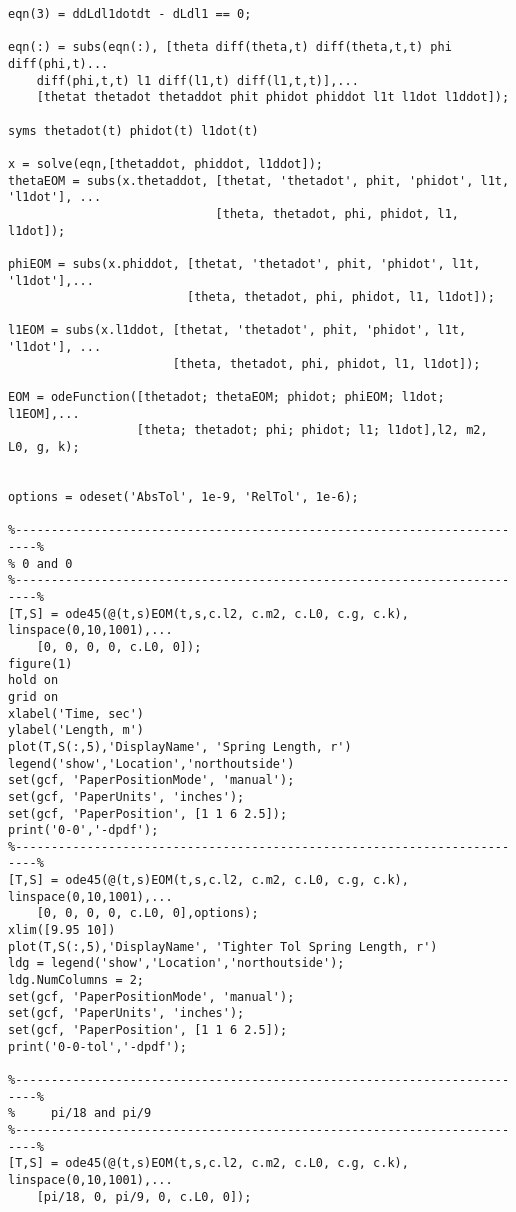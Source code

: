 \begin{lstlisting}[frame=lines,style=Matlab-editor,basicstyle = \mlttfamily]
% l (spring) EOM
eqn(3) = ddLdl1dotdt - dLdl1 == 0;

eqn(:) = subs(eqn(:), [theta diff(theta,t) diff(theta,t,t) phi diff(phi,t)...
    diff(phi,t,t) l1 diff(l1,t) diff(l1,t,t)],...
    [thetat thetadot thetaddot phit phidot phiddot l1t l1dot l1ddot]);

syms thetadot(t) phidot(t) l1dot(t)

x = solve(eqn,[thetaddot, phiddot, l1ddot]);
thetaEOM = subs(x.thetaddot, [thetat, 'thetadot', phit, 'phidot', l1t, 'l1dot'], ...
                             [theta, thetadot, phi, phidot, l1, l1dot]);

phiEOM = subs(x.phiddot, [thetat, 'thetadot', phit, 'phidot', l1t, 'l1dot'],...
                         [theta, thetadot, phi, phidot, l1, l1dot]);

l1EOM = subs(x.l1ddot, [thetat, 'thetadot', phit, 'phidot', l1t, 'l1dot'], ...
                       [theta, thetadot, phi, phidot, l1, l1dot]);

EOM = odeFunction([thetadot; thetaEOM; phidot; phiEOM; l1dot; l1EOM],...
                  [theta; thetadot; phi; phidot; l1; l1dot],l2, m2, L0, g, k);


options = odeset('AbsTol', 1e-9, 'RelTol', 1e-6);

%-------------------------------------------------------------------------%
% 0 and 0
%-------------------------------------------------------------------------%
[T,S] = ode45(@(t,s)EOM(t,s,c.l2, c.m2, c.L0, c.g, c.k), linspace(0,10,1001),...
    [0, 0, 0, 0, c.L0, 0]);
figure(1)
hold on
grid on
xlabel('Time, sec')
ylabel('Length, m')
plot(T,S(:,5),'DisplayName', 'Spring Length, r')
legend('show','Location','northoutside')
set(gcf, 'PaperPositionMode', 'manual');
set(gcf, 'PaperUnits', 'inches');
set(gcf, 'PaperPosition', [1 1 6 2.5]);
print('0-0','-dpdf');
%-------------------------------------------------------------------------%
[T,S] = ode45(@(t,s)EOM(t,s,c.l2, c.m2, c.L0, c.g, c.k), linspace(0,10,1001),...
    [0, 0, 0, 0, c.L0, 0],options);
xlim([9.95 10])
plot(T,S(:,5),'DisplayName', 'Tighter Tol Spring Length, r')
ldg = legend('show','Location','northoutside');
ldg.NumColumns = 2;
set(gcf, 'PaperPositionMode', 'manual');
set(gcf, 'PaperUnits', 'inches');
set(gcf, 'PaperPosition', [1 1 6 2.5]);
print('0-0-tol','-dpdf');

%-------------------------------------------------------------------------%
%     pi/18 and pi/9
%-------------------------------------------------------------------------%
[T,S] = ode45(@(t,s)EOM(t,s,c.l2, c.m2, c.L0, c.g, c.k), linspace(0,10,1001),...
    [pi/18, 0, pi/9, 0, c.L0, 0]);


\end{lstlisting}
